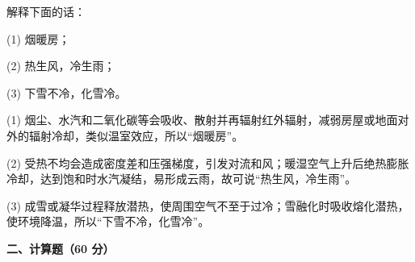 \begin{question}
解释下面的话：

(1) 烟暖房；

(2) 热生风，冷生雨；

(3) 下雪不冷，化雪冷。
\begin{solution}
(1) 烟尘、水汽和二氧化碳等会吸收、散射并再辐射红外辐射，减弱房屋或地面对外的辐射冷却，类似温室效应，所以“烟暖房”。

(2) 受热不均会造成密度差和压强梯度，引发对流和风；暖湿空气上升后绝热膨胀冷却，达到饱和时水汽凝结，易形成云雨，故可说“热生风，冷生雨”。

(3) 成雪或凝华过程释放潜热，使周围空气不至于过冷；雪融化时吸收熔化潜热，使环境降温，所以“下雪不冷，化雪冷”。

\end{solution}
\end{question}

\textbf{二、计算题（60 分）}

